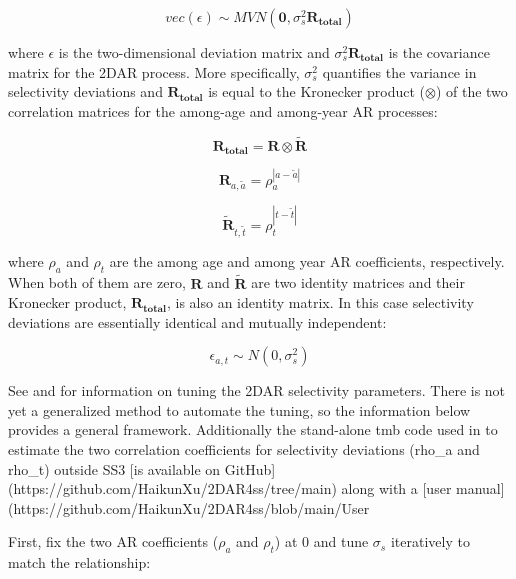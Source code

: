 \begin{equation}
vec(\epsilon) \sim MVN(\mathbf{0},\sigma_s^2\mathbf{R_{total}})
\end{equation}

where $\epsilon$ is the two-dimensional deviation matrix and $\sigma_s^2\mathbf{R_{total}}$ is the covariance matrix for the 2DAR process. More specifically, $\sigma_s^2$ quantifies the variance in selectivity deviations and $\mathbf{R_{total}}$ is equal to the Kronecker product ($\otimes$) of the two correlation matrices for the among-age and among-year AR processes:

\begin{equation}
\mathbf{R_{total}}=\mathbf{R}\otimes\mathbf{\tilde{R}}
\end{equation}

\begin{equation}
\mathbf{R}_{a,\tilde{a}}=\rho_a^{|a-\tilde{a}|}
\end{equation}

\begin{equation}
\mathbf{\tilde{R}}_{t,\tilde{t}}=\rho_t^{|t-\tilde{t}|}
\end{equation}

where $\rho_a$ and $\rho_t$ are the among age and among year AR coefficients, respectively. When both of them are zero, $\mathbf{R}$ and $\mathbf{\tilde{R}}$ are two identity matrices and their Kronecker product, $\mathbf{R_{total}}$, is also an identity matrix. In this case selectivity deviations are essentially identical and mutually independent:

\begin{equation}
\epsilon_{a,t}\sim N(0,\sigma_s^2)
\end{equation} 

See \citet{xu-new-2019} and \citet{xu-comparing-2020} for information on tuning the 2DAR selectivity parameters. There is not yet a generalized method to automate the tuning, so the information below provides a general framework. Additionally the stand-alone \gls{tmb} code used in \citet{xu-new-2019} to estimate the two correlation coefficients for selectivity deviations (rho\_a and rho\_t) outside SS3 [is available on GitHub](https://github.com/HaikunXu/2DAR4ss/tree/main) along with a [user manual](https://github.com/HaikunXu/2DAR4ss/blob/main/User%

First, fix the two AR coefficients ($\rho_a$ and $\rho_t$) at 0 and tune $\sigma_s$ iteratively to match the relationship:

